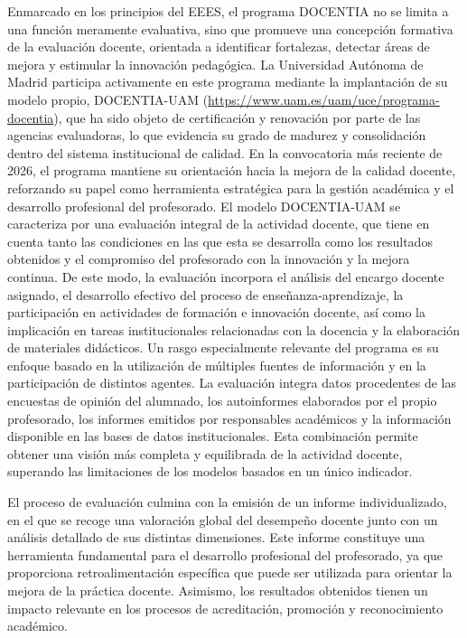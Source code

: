 \documentclass[
  11pt,
  a4paper,
  twoside]{scrreprt}
\begin{document}
Enmarcado en los principios del EEES, el programa DOCENTIA no se limita
a una función meramente evaluativa, sino que promueve una concepción
formativa de la evaluación docente, orientada a identificar fortalezas,
detectar áreas de mejora y estimular la innovación pedagógica. La
Universidad Autónoma de Madrid participa activamente en este programa
mediante la implantación de su modelo propio, DOCENTIA-UAM
(\url{https://www.uam.es/uam/uce/programa-docentia}), que ha sido objeto
de certificación y renovación por parte de las agencias evaluadoras, lo
que evidencia su grado de madurez y consolidación dentro del sistema
institucional de calidad. En la convocatoria más reciente de 2026, el
programa mantiene su orientación hacia la mejora de la calidad docente,
reforzando su papel como herramienta estratégica para la gestión
académica y el desarrollo profesional del profesorado. El modelo
DOCENTIA-UAM se caracteriza por una evaluación integral de la actividad
docente, que tiene en cuenta tanto las condiciones en las que esta se
desarrolla como los resultados obtenidos y el compromiso del profesorado
con la innovación y la mejora continua. De este modo, la evaluación
incorpora el análisis del encargo docente asignado, el desarrollo
efectivo del proceso de enseñanza-aprendizaje, la participación en
actividades de formación e innovación docente, así como la implicación
en tareas institucionales relacionadas con la docencia y la elaboración
de materiales didácticos. Un rasgo especialmente relevante del programa
es su enfoque basado en la utilización de múltiples fuentes de
información y en la participación de distintos agentes. La evaluación
integra datos procedentes de las encuestas de opinión del alumnado, los
autoinformes elaborados por el propio profesorado, los informes emitidos
por responsables académicos y la información disponible en las bases de
datos institucionales. Esta combinación permite obtener una visión más
completa y equilibrada de la actividad docente, superando las
limitaciones de los modelos basados en un único indicador.

El proceso de evaluación culmina con la emisión de un informe
individualizado, en el que se recoge una valoración global del desempeño
docente junto con un análisis detallado de sus distintas dimensiones.
Este informe constituye una herramienta fundamental para el desarrollo
profesional del profesorado, ya que proporciona retroalimentación
específica que puede ser utilizada para orientar la mejora de la
práctica docente. Asimismo, los resultados obtenidos tienen un impacto
relevante en los procesos de acreditación, promoción y reconocimiento
académico.
\end{document}
